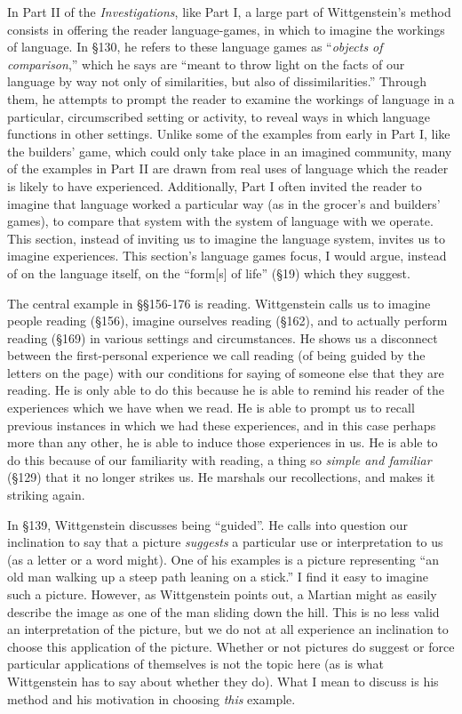 \documentclass[doc,12pt,apacite,biblatex]{apa6}
\begin{document}
In Part II of the \emph{Investigations}, like Part I, a large part of
Wittgenstein's method consists in offering the reader language-games, in which
to imagine the workings of language. In \S 130, he refers to these language
games as ``\emph{objects of comparison},'' which he says are ``meant to throw
light on the facts of our language by way not only of similarities, but also of
dissimilarities.'' Through them, he attempts to prompt the reader to examine
the workings of language in a particular, circumscribed setting or activity, to
reveal ways in which language functions in other settings. Unlike some of the
examples from early in Part I, like the builders' game, which could only take
place in an imagined community, many of the examples in Part II are drawn from
real uses of language which the reader is likely to have experienced.
Additionally, Part I often invited the reader to imagine that language worked a
particular way (as in the grocer's and builders' games), to compare that system
with the system of language with we operate. This section, instead of inviting
us to imagine the language system, invites us to imagine experiences. This
section's language games focus, I would argue, instead of on the language
itself, on the ``form[s] of life'' (\S 19) which they suggest.

The central example in \S\S 156-176 is reading. Wittgenstein calls us to
imagine people reading (\S 156), imagine ourselves reading (\S 162), and to
actually perform reading (\S 169) in various settings and circumstances.  He
shows us a disconnect between the first-personal experience we call reading (of
being guided by the letters on the page) with our conditions for saying of
someone else that they are reading.  He is only able to do this because he is
able to remind his reader of the experiences which we have when we read. He is
able to prompt us to recall previous instances in which we had these
experiences, and in this case perhaps more than any other, he is able to induce
those experiences in us. He is able to do this because of our familiarity with
reading, a thing so \emph{simple and familiar} (\S 129) that it no longer
strikes us. He marshals our recollections, and makes it striking again.

In \S 139, Wittgenstein discusses being ``guided''. He calls into question our
inclination to say that a picture \emph{suggests} a particular use or
interpretation to us (as a letter or a word might).  One of his examples is a
picture representing ``an old man walking up a steep path leaning on a stick.''
I find it easy to imagine such a picture. However, as Wittgenstein points out,
a Martian might as easily describe the image as one of the man sliding down the
hill. This is no less valid an interpretation of the picture, but we do not at
all experience an inclination to choose this application of the picture.
Whether or not pictures do suggest or force particular applications of
themselves is not the topic here (as is what Wittgenstein has to say about
whether they do). What I mean to discuss is his method and his motivation in
choosing \emph{this} example.
\end{document}
